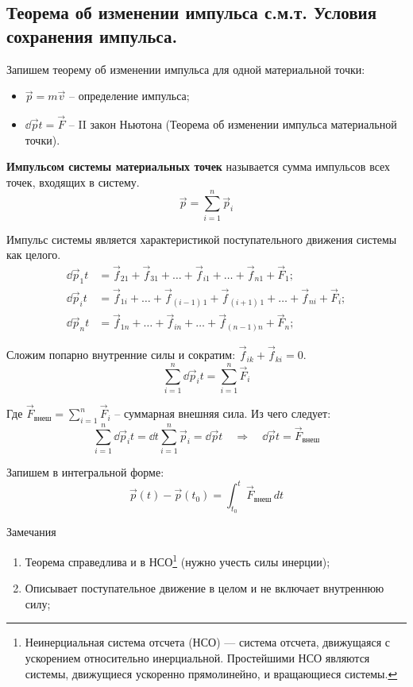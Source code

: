 \subsection{\textbf{Теорема об изменении импульса с.м.т.} Условия сохранения импульса.}

Запишем теорему об изменении импульса для одной материальной точки:
\begin{itemize}
	\item \(\vec{p} = m\vec{v}\) -- определение импульса;
	\item \(\dd{\vec{p}}{t} = \vec{F}\) -- II закон Ньютона (Теорема об изменении импульса материальной точки).
\end{itemize}

\textbf{Импульсом системы материальных точек} называется сумма импульсов всех точек, входящих в систему.
\[\vec{p} = \sum_{i=1}^{n} \vec{p}_i\]

Импульс системы является характеристикой поступательного движения системы как целого.
\begin{align*}
	\dd{\vec{p}_1}{t} &= \vec{f}_{21} + \vec{f}_{31} + \dots + \vec{f}_{i1} + \dots + \vec{f}_{n1} + \vec{F}_1; \\
	\dd{\vec{p}_i}{t} &= \vec{f}_{1i} + \dots + \vec{f}_{(i-1) \, 1} +\vec{f}_{(i+1) \, 1} + \dots + \vec{f}_{ni} + \vec{F}_i; \\
	\dd{\vec{p}_n}{t} &= \vec{f}_{1n} + \dots + \vec{f}_{in} + \dots + \vec{f}_{(n-1)n} + \vec{F}_n;
\end{align*}

Сложим попарно внутренние силы и сократим: \(\vec{f}_{ik} + \vec{f}_{ki} = 0\).
\[\sum_{i=1}^{n} \dd{\vec{p}_i}{t} = \sum_{i=1}^{n} \vec{F}_i\]

Где $\vec{F}_{\text{внеш}} = \sum_{i=1}^{n} \vec{F}_i$ -- суммарная внешняя сила. Из чего следует:
\[\sum_{i=1}^{n} \dd{\vec{p}_i}{t} = \dd{}{t} \sum_{i=1}^{n} \vec{p}_i = \dd{\vec{p}}{t} \quad\Rightarrow\quad \boxed{\dd{\vec{p}}{t} = \vec{F}_\text{внеш}}\]

Запишем в интегральной форме:
\[\boxed{\vec{p}(t) - \vec{p}(t_0) = \int_{t_0}^{t} \vec{F}_{\text{внеш}} \, dt}\]

\begin{tbox}{Замечания}
	\begin{enumerate}
		\item Теорема справедлива и в НСО\footnote{Неинерциальная система отсчета (НСО) — система отсчета, движущаяся с ускорением относительно инерциальной. Простейшими НСО являются системы, движущиеся ускоренно прямолинейно, и вращающиеся системы.} (нужно учесть силы инерции);
		\item Описывает поступательное движение в целом и не включает внутреннюю силу;
	\end{enumerate}
\end{tbox}

